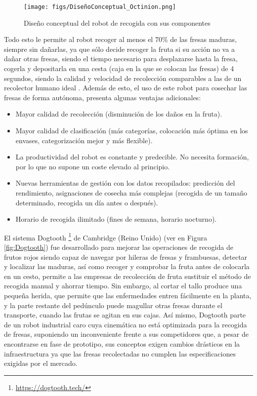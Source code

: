 \begin{figure} [H]
    \begin{center}
      \texttt{[image: figs/DiseñoConceptual\_Octinion.png]}
    \end{center}
    \caption{Diseño conceptual del robot de recogida con sus componentes}
    \label{fig:DiseñoConceptual_Octinion}
\end{figure}

Todo esto le permite al robot recoger al menos el 70\% de las fresas maduras, siempre sin dañarlas, ya que sólo decide recoger la fruta si su acción no va a dañar otras fresas, siendo el tiempo necesario para desplazarse hasta la fresa, cogerla y depositarla en una cesta (caja en la que se colocan las
fresas) de 4 segundos, siendo la calidad y velocidad de recolección comparables a las de un recolector humano ideal \cite{DePreter18}. Además de esto, el uso de este robot para cosechar las fresas de forma autónoma, presenta algunas ventajas adicionales:

\begin{itemize}
    \item Mayor calidad de recolección (disminución de los daños en la fruta).
    \item Mayor calidad de clasificación (más categorías, colocación más óptima 								en los envases, categorización mejor y más flexible).
    \item La productividad del robot es constante y predecible. No necesita formación, por lo que no supone un coste elevado al principio.
    \item Nuevas herramientas de gestión con los datos recopilados: predicción del rendimiento, asignaciones de cosecha más complejas (recogida de un tamaño
determinado, recogida un día antes o después).
    \item Horario de recogida ilimitado (fines de semana, horario nocturno).
\end{itemize}

El sistema Dogtooth \footnote{\url{https://dogtooth.tech/}} de Cambridge (Reino Unido) (ver en Figura \ref{fig:Dogtooth}) fue desarrollado para mejorar las operaciones de recogida de frutos rojos siendo capaz de navegar por hileras de fresas y frambuesas, detectar y localizar las maduras, así como recoger y comprobar la fruta antes de colocarla en un cesto, permite a las empresas de recolección de fruta sustituir el método de recogida manual y ahorrar tiempo. Sin embargo, al cortar el tallo produce una pequeña herida, que permite que las enfermedades entren fácilmente en la planta, y la parte restante del pedúnculo puede magullar otras fresas durante el transporte, cuando las frutas se agitan en sus cajas. Así mismo, Dogtooth parte de un robot industrial caro cuya cinemática no está optimizada para la recogida de fresas, suponiendo un inconveniente frente a sus competidores que, a pesar de encontrarse en fase de prototipo, sus conceptos exigen cambios drásticos en la infraestructura ya que las fresas recolectadas no cumplen las especificaciones exigidas por el mercado. 

